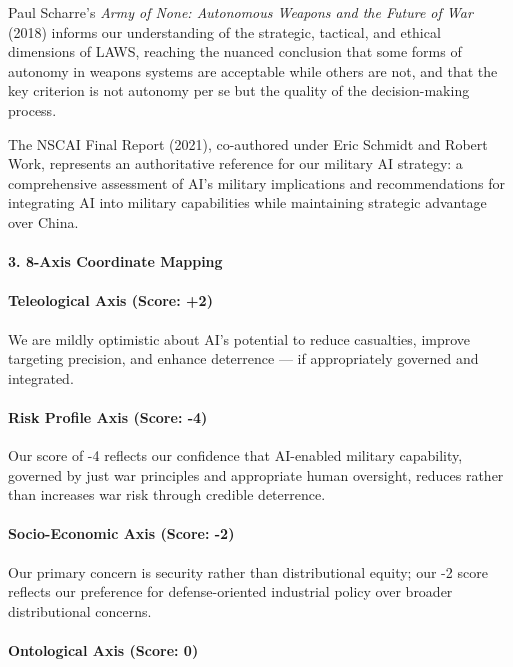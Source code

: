 Paul Scharre's \emph{Army of None: Autonomous Weapons and the Future of
War} (2018) informs our understanding of the strategic, tactical, and
ethical dimensions of LAWS, reaching the nuanced conclusion that some
forms of autonomy in weapons systems are acceptable while others are
not, and that the key criterion is not autonomy per se but the quality
of the decision-making process.

The NSCAI Final Report (2021), co-authored under Eric Schmidt and Robert
Work, represents an authoritative reference for our military AI
strategy: a comprehensive assessment of AI's military implications and
recommendations for integrating AI into military capabilities while
maintaining strategic advantage over China.

\paragraph{3. 8-Axis Coordinate
Mapping}\label{axis-coordinate-mapping-23}

\paragraph{Teleological Axis (Score:
+2)}\label{teleological-axis-score-2-2}

We are mildly optimistic about AI's potential to reduce casualties,
improve targeting precision, and enhance deterrence --- if appropriately
governed and integrated.

\paragraph{Risk Profile Axis (Score:
-4)}\label{risk-profile-axis-score--4-2}

Our score of -4 reflects our confidence that AI-enabled military
capability, governed by just war principles and appropriate human
oversight, reduces rather than increases war risk through credible
deterrence.

\paragraph{Socio-Economic Axis (Score:
-2)}\label{socio-economic-axis-score--2-1}

Our primary concern is security rather than distributional equity; our
-2 score reflects our preference for defense-oriented industrial policy
over broader distributional concerns.

\paragraph{Ontological Axis (Score:
0)}\label{ontological-axis-score-0-8}

